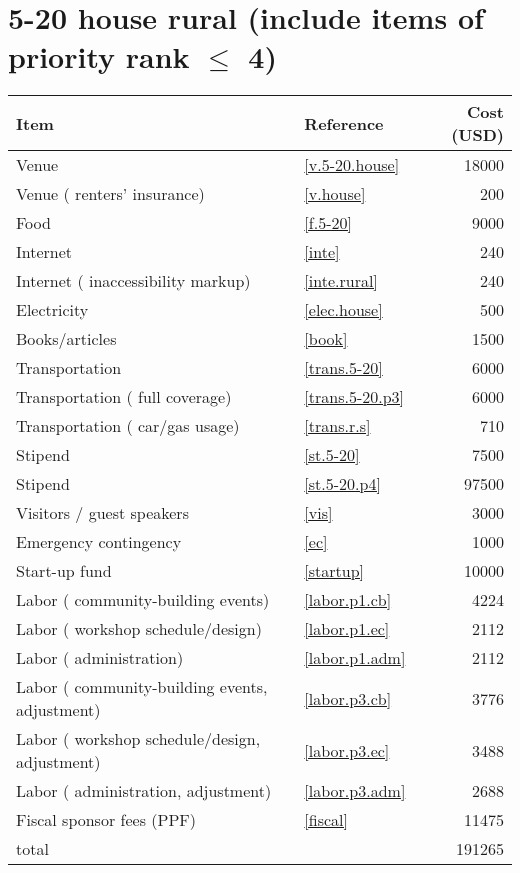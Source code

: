 \section*{5-20 house rural (include items of priority rank $\leq$ 4)}
\begin{center}
\begin{tabular}{llr}
Item & Reference & Cost (USD) \\ \hline
Venue & \ref{v.5-20.house} & 18000 \\
Venue ( renters' insurance) & \ref{v.house} & 200 \\
Food & \ref{f.5-20} & 9000 \\
Internet & \ref{inte} & 240 \\
Internet ( inaccessibility markup) & \ref{inte.rural} & 240 \\
Electricity & \ref{elec.house} & 500 \\
Books/articles & \ref{book} & 1500 \\
Transportation & \ref{trans.5-20} & 6000 \\
Transportation ( full coverage) & \ref{trans.5-20.p3} & 6000 \\
Transportation ( car/gas usage) & \ref{trans.r.s} & 710 \\
Stipend & \ref{st.5-20} & 7500 \\
Stipend & \ref{st.5-20.p4} & 97500 \\
Visitors / guest speakers & \ref{vis} & 3000 \\
Emergency contingency & \ref{ec} & 1000 \\
Start-up fund & \ref{startup} & 10000 \\
Labor ( community-building events) & \ref{labor.p1.cb} & 4224 \\
Labor ( workshop schedule/design) & \ref{labor.p1.ec} & 2112 \\
Labor ( administration) & \ref{labor.p1.adm} & 2112 \\
Labor ( community-building events, adjustment) & \ref{labor.p3.cb} & 3776 \\
Labor ( workshop schedule/design, adjustment) & \ref{labor.p3.ec} & 3488 \\
Labor ( administration, adjustment) & \ref{labor.p3.adm} & 2688 \\
Fiscal sponsor fees (PPF) & \ref{fiscal} & 11475 \\ \hline
total &  & 191265
\end{tabular}
\end{center}
\newpage
